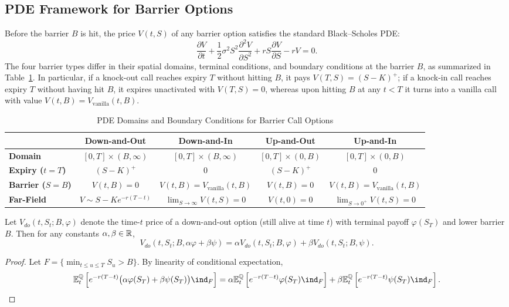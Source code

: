 \subsection{PDE Framework for Barrier Options}

Before the barrier $B$ is hit, the price $V(t, S)$ of any barrier option satisfies the standard Black--Scholes PDE:
\[
\frac{\partial V}{\partial t} + \frac{1}{2}\sigma^2 S^2 \frac{\partial^2 V}{\partial S^2} + r S \frac{\partial V}{\partial S} - r V = 0.
\]
The four barrier types differ in their spatial domains, terminal conditions, and boundary conditions at the barrier $B$, as summarized in Table~\ref{tab:barrier-pde}. In particular, if a knock-out call reaches expiry $T$ without hitting $B$, it pays $V(T, S) = (S - K)^+$; if a knock-in call reaches expiry $T$ without having hit $B$, it expires unactivated with $V(T, S) = 0$, whereas upon hitting $B$ at any $t < T$ it turns into a vanilla call with value $V(t, B) = V_{\text{vanilla}}(t, B)$.

\begin{table}[!htbp]
    \centering
    \small
    \caption{PDE Domains and Boundary Conditions for Barrier Call Options}\label{tab:barrier-pde}
    \begin{tabular}{l c c c c}
        \toprule
        & \textbf{Down-and-Out} & \textbf{Down-and-In} & \textbf{Up-and-Out} & \textbf{Up-and-In} \\
        \midrule
        \textbf{Domain} & $[0, T] \times (B, \infty)$ & $[0, T] \times (B, \infty)$ & $[0, T] \times (0, B)$ & $[0, T] \times (0, B)$ \\
        \textbf{Expiry ($t = T$)} & $(S - K)^+$ & $0$ & $(S - K)^+$ & $0$ \\
        \textbf{Barrier ($S = B$)} & $V(t, B) = 0$ & $V(t, B) = V_{\text{vanilla}}(t, B)$ & $V(t, B) = 0$ & $V(t, B) = V_{\text{vanilla}}(t, B)$ \\
        \textbf{Far-Field} & $V \sim S - K e^{-r(T-t)}$ & $\lim_{S \to \infty} V(t, S) = 0$ & $V(t, 0) = 0$ & $\lim_{S \to 0^+} V(t, S) = 0$ \\
        \bottomrule
    \end{tabular}
\end{table}

\begin{lemma}\label{lem:barrier-linearity}
    Let $V_{do}(t, S_t; B, \varphi)$ denote the time-$t$ price of a down-and-out option (still alive at time $t$) with terminal payoff $\varphi(S_T)$ and lower barrier $B$. Then for any constants $\alpha, \beta \in \mathbb{R}$,
    \[
    V_{do}(t, S_t; B, \alpha\varphi + \beta\psi) = \alpha V_{do}(t, S_t; B, \varphi) + \beta V_{do}(t, S_t; B, \psi).
    \]
\end{lemma}
\begin{proof}
    Let $F = \{\min_{t \le u \le T} S_u > B\}$. By linearity of conditional expectation,
    \[
    \E_t^{\Q}\left[e^{-r(T-t)}\bigl(\alpha\varphi(S_T) + \beta\psi(S_T)\bigr)\ind_F\right] = \alpha\E_t^{\Q}\left[e^{-r(T-t)}\varphi(S_T)\ind_F\right] + \beta\E_t^{\Q}\left[e^{-r(T-t)}\psi(S_T)\ind_F\right]. \qedhere
    \]
\end{proof}

